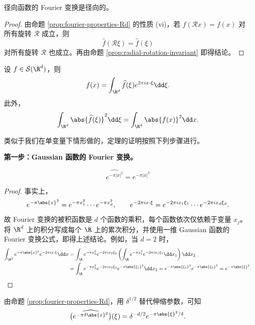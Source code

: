 \begin{corollary}\label{cor:fourier-radial-Rd}
	径向函数的 Fourier 变换是径向的。
\end{corollary}

\begin{proof}
	由命题 \ref{prop:fourier-properties-Rd} 的性质 (vi)，若 $f(\mathcal{R}x)=f(x)$ 对所有旋转 $\mathcal{R}$ 成立，则
	\[
	\widehat f(\mathcal{R}\xi)=\widehat f(\xi)
	\]
	对所有旋转 $\mathcal{R}$ 也成立。再由命题 \ref{prop:radial-rotation-invariant} 即得结论。
\end{proof}

\begin{theorem}\label{thm:fourier-inversion-plancherel-Rd}
	设 $f\in\mathcal S(\R^d)$，则
	\[
	f(x)=\int_{\R^d}\widehat f(\xi)e^{2\pi i x\cdot\xi}\dd\xi.
	\]
	此外，
	\[
	\int_{\R^d}\abs{\widehat f(\xi)}^2\dd\xi
	=\int_{\R^d}\abs{f(x)}^2\dd x.
	\]
\end{theorem}

类似于我们在单变量下情形做的，定理的证明按照下列步骤进行。

	\textbf{第一步：Gaussian 函数的 Fourier 变换。}

\begin{proposition}
\[\widehat{e^{-\pi|x|^2}}=e^{-\pi|x|^2}\]
\end{proposition}
\begin{proof}
			事实上，
\[
e^{-\pi\abs{x}^2}
=e^{-\pi x_1^2}\cdots e^{-\pi x_d^2},
\qquad
e^{-2\pi i x\cdot\xi}
=e^{-2\pi i x_1\xi_1}\cdots e^{-2\pi i x_d\xi_d}.
\]
	故 Fourier 变换的被积函数是 $d$ 个函数的乘积，每个函数依次仅依赖于变量 $x_j$。将 $\R^d$ 上的积分写成每个 $\R$ 上的累次积分，并使用一维 Gaussian 函数的 Fourier 变换公式，即得上述结论。例如，当 $d=2$ 时，
	\[
	\begin{aligned}
	\int_{\R^2}e^{-\pi\abs{x}^2}e^{-2\pi i x\cdot\xi}\dd x&=\int_{\R}e^{-\pi x_2^2}e^{-2\pi i x_2\xi_2}
	\left(\int_{\R}e^{-\pi x_1^2}e^{-2\pi i x_1\xi_1}\dd x_1\right)\dd x_2\\
	&=\int_{\R}e^{-\pi x_2^2}e^{-2\pi i x_2\xi_2}
	e^{-\pi\abs{\xi_1}^2}\dd x_2=e^{-\pi\abs{\xi_1}^2}e^{-\pi\abs{\xi_2}^2}
	=e^{-\pi\abs{\xi}^2}.
	\end{aligned}
	\]
\end{proof}
	由命题 \ref{prop:fourier-properties-Rd}，用 $\delta^{1/2}$ 替代伸缩参数，可知
	\[
	\widehat{\left(e^{-\pi\delta\abs{x}^2}\right)}(\xi)
	=\delta^{-d/2}e^{-\pi\abs{\xi}^2/\delta}.
	\]

